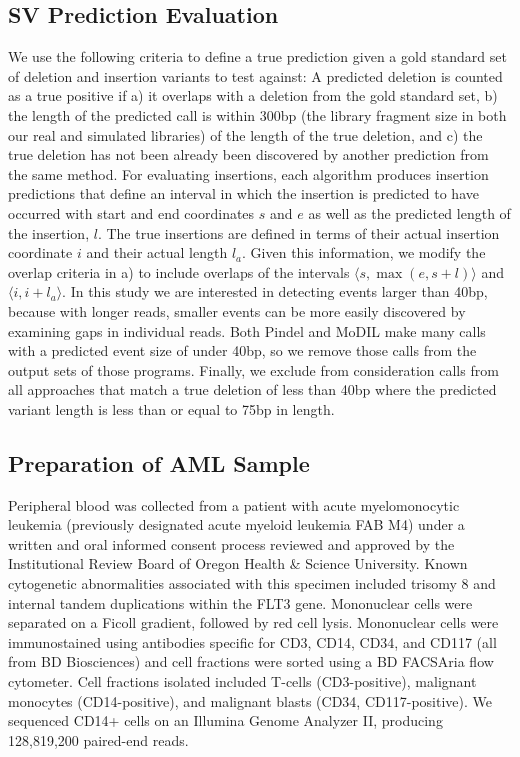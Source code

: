 \documentclass[10pt]{bmc_article}
\newenvironment{bmcformat}{\fussy\setboolean{publ}{true}}{\fussy}
\begin{document}
\begin{bmcformat}
\subsection*{SV Prediction Evaluation}
We use the following criteria to define a true prediction given a gold standard set of deletion and insertion variants to test against: A predicted deletion is counted as a true positive if a) it overlaps with a deletion from the gold standard set, b) the length of the predicted call is within 300bp (the library fragment size in both our real and simulated libraries) of the length of the true deletion, and c) the true deletion has not been already been discovered by another prediction from the same method. For evaluating insertions, each algorithm produces insertion predictions that define an interval in which the insertion is predicted to have occurred with start and end coordinates $s$ and $e$ as well as the predicted length of the insertion, $l$. The true insertions are defined in terms of their actual insertion coordinate $i$ and their actual length $l_a$. Given this information, we modify the overlap criteria in a) to include overlaps of the intervals $\langle s,\max{\left(e,s+l\right)} \rangle$ and $\langle i,i+l_a \rangle$. In this study we are interested in detecting events larger than 40bp, because with longer reads, smaller events can be more easily discovered by examining gaps in individual reads. Both Pindel and MoDIL make many calls with a predicted event size of under 40bp, so we remove those calls from the output sets of those programs. Finally, we exclude from consideration calls from all approaches that match a true deletion of less than 40bp where the predicted variant length is less than or equal to 75bp in length.

\subsection*{Preparation of AML Sample}

Peripheral blood was collected from a patient with acute myelomonocytic leukemia (previously designated acute myeloid leukemia FAB M4) under a written and oral informed consent process reviewed and approved by the Institutional Review Board of Oregon Health \& Science University. Known cytogenetic abnormalities associated with this specimen included trisomy 8 and internal tandem duplications within the FLT3 gene. Mononuclear cells were separated on a Ficoll gradient, followed by red cell lysis. Mononuclear cells were immunostained using antibodies specific for CD3, CD14, CD34, and CD117 (all from BD Biosciences) and cell fractions were sorted using a BD FACSAria flow cytometer. Cell fractions isolated included T-cells (CD3-positive), malignant monocytes (CD14-positive), and malignant blasts (CD34, CD117-positive). We sequenced CD14+ cells on an Illumina Genome Analyzer II, producing 128,819,200 paired-end reads.


\end{bmcformat}
\end{document}
